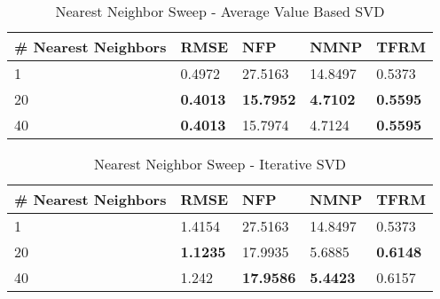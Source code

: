\begin{enumerate}
\begin{table}[]
\centering
\caption{Nearest Neighbor Sweep - Average Value Based SVD}
\label{tab:nnaverage}
\begin{tabular}{|l|l|l|l|l|}
\hline
\# Nearest Neighbors & RMSE   & NFP     & NMNP    & TFRM   \\ \hline
1                    & 0.4972 & 27.5163 & 14.8497 & 0.5373 \\ \hline
20                   & \textbf{0.4013} & \textbf{15.7952} & \textbf{4.7102}  & \textbf{0.5595} \\ \hline
40                   & \textbf{0.4013} & 15.7974 & 4.7124  & \textbf{0.5595} \\ \hline
\end{tabular}
\end{table}

\begin{table}[]
\centering
\caption{Nearest Neighbor Sweep - Iterative SVD}
\label{tab:nniterative}
\begin{tabular}{|l|l|l|l|l|}
\hline
\# Nearest Neighbors & RMSE   & NFP     & NMNP    & TFRM   \\ \hline
1                    & 1.4154 & 27.5163 & 14.8497 & 0.5373 \\ \hline
20                   & \textbf{1.1235} & 17.9935 & 5.6885  & \textbf{0.6148} \\ \hline
40                   & 1.242  & \textbf{17.9586} & \textbf{5.4423}  & 0.6157 \\ \hline
\end{tabular}
\end{table}


\end{enumerate}

